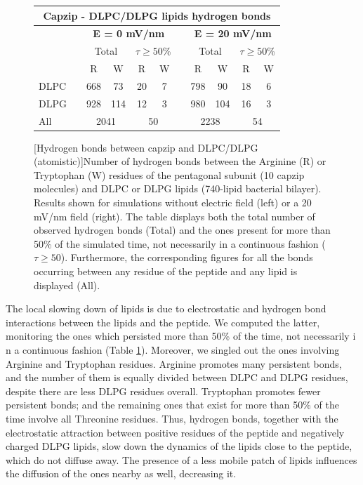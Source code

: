 \begin{figure}[p!]
\centering
 \def\arraystretch{1.6}
\begin{tabular}{lcccccccccc}
\multicolumn{11}{c}{\textbf{Capzip - DLPC/DLPG lipids hydrogen bonds}} \\
\hline
&& \multicolumn{4}{c}{\textbf{E = 0 mV/nm}} && \multicolumn{4}{c}{\textbf{E = 20 mV/nm}} \\
\hline
 && \multicolumn{2}{c}{Total} & \multicolumn{2}{c}{$\displaystyle\tau \ge 50$\%}  && \multicolumn{2}{c}{Total} & \multicolumn{2}{c}{$\displaystyle\tau \ge 50$\%} \\
\hline
  && \multicolumn{1}{c}{R} & \multicolumn{1}{c}{W} & \multicolumn{1}{c}{R} & \multicolumn{1}{c}{W} && \multicolumn{1}{c}{R} & \multicolumn{1}{c}{W} & \multicolumn{1}{c}{R} & \multicolumn{1}{c}{W} \\
 {DLPC} && 668 & 73 & 20 & 7 && 798 & 90 & 18 & 6 \\
 {DLPG} && 928 & 114 & 12 & 3 && 980 & 104 & 16 & 3 \\
 \hline
 {All} && \multicolumn{2}{c}{2041} & \multicolumn{2}{c}{50} && \multicolumn{2}{c}{2238} & \multicolumn{2}{c}{54} \\
\hline
 \end{tabular}
[Hydrogen bonds between capzip and DLPC/DLPG (atomistic)]{Number of hydrogen bonds between the Arginine (R) or Tryptophan (W) residues of the pentagonal subunit (10 capzip molecules) and DLPC or DLPG lipids (740-lipid bacterial bilayer). Results shown for simulations without electric field (left) or a 20 mV/nm field (right).
%
The table displays both the total number of observed hydrogen bonds (Total) and the ones present for more than 50\% of the simulated time, not necessarily in a continuous fashion ($\displaystyle\tau \ge 50$). Furthermore, the corresponding figures for all the bonds occurring between any residue of the peptide and any lipid is displayed (All).}
\label{table:hb_pr_lip}
\end{figure}

The local slowing down of lipids is due to electrostatic and hydrogen bond interactions between the lipids and the peptide. We computed the latter, monitoring the ones which persisted more than 50\% of the time, not necessarily i n a continuous fashion (Table \ref{table:hb_pr_lip}). Moreover, we singled out the ones involving Arginine and Tryptophan residues.
%
Arginine promotes many persistent bonds, and the number of them is equally divided between DLPC and DLPG residues, despite there are less DLPG residues overall. Tryptophan promotes fewer persistent bonds; and the remaining ones that exist for more than 50\% of the time involve all Threonine residues.
%
Thus, hydrogen bonds, together with the electrostatic attraction between positive residues of the peptide and negatively charged DLPG lipids, slow down the dynamics of the lipids close to the peptide, which do not diffuse away. The presence of a less mobile patch of lipids influences the diffusion of the ones nearby as well, decreasing it.

